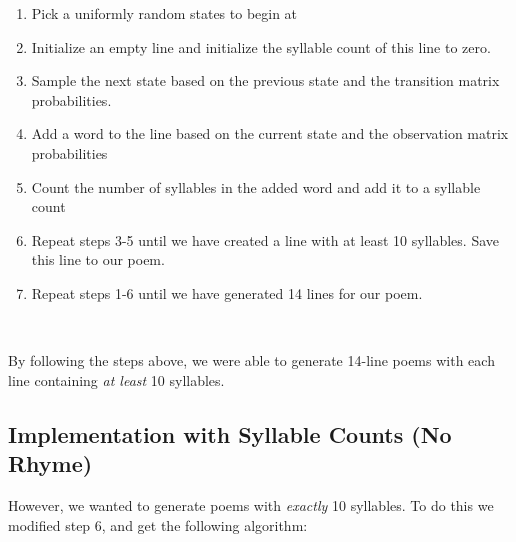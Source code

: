 \begin{enumerate}

\item Pick a uniformly random states to begin at

\item Initialize an empty line and initialize the syllable count of this line to zero.

\item Sample the next state based on the previous state and the transition matrix probabilities.

\item Add a word to the line based on the current state and the observation matrix probabilities

\item Count the number of syllables in the added word and add it to a syllable count

\item Repeat steps 3-5 until we have created a line with at least 10 syllables. Save this line to our poem.

\item Repeat steps 1-6 until we have generated 14 lines for our poem.

\end{enumerate}
~

By following the steps above, we were able to generate 14-line poems with each line containing \textit{at least} 10 syllables. 

\subsection*{Implementation with Syllable Counts (No Rhyme)}

However, we wanted to generate poems with \textit{exactly} 10 syllables. To do this we modified step 6, and get the following algorithm:

